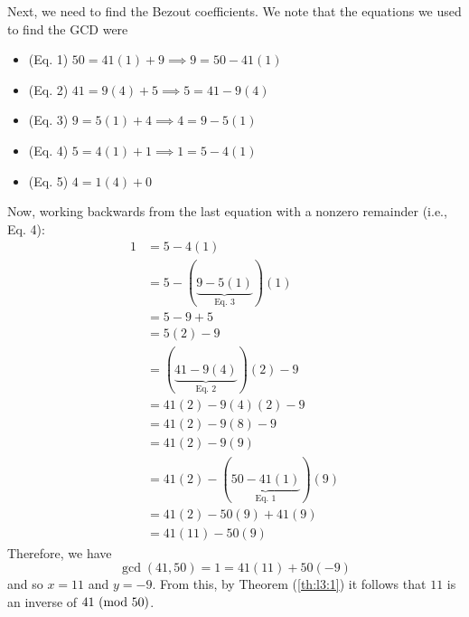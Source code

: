 \documentclass[letterpaper]{article}
\newcommand{\0}{\mathbf{0}}
\begin{document}
\begin{mdframed}
\begin{itemize}
\begin{mdframed}
            \bigskip 

            Next, we need to find the Bezout coefficients. We note that the equations we used to find the GCD were
            \begin{itemize}
                \item (Eq. 1) $50 = 41(1) + 9 \implies 9 = 50 - 41(1)$
                \item (Eq. 2) $41 = 9(4) + 5 \implies 5 = 41 - 9(4)$
                \item (Eq. 3) $9 = 5(1) + 4 \implies 4 = 9 - 5(1)$
                \item (Eq. 4) $5 = 4(1) + 1 \implies 1 = 5 - 4(1)$
                \item (Eq. 5) $4 = 1(4) + 0$
            \end{itemize}
            
            Now, working backwards from the last equation with a nonzero remainder (i.e., Eq. 4):
            \begin{equation*}
                \begin{aligned}
                    1 &= 5 - 4(1) \\ 
                        &= 5 - (\underbrace{9 - 5(1)}_{\text{Eq. 3}})(1) \\ 
                        &= 5 - 9 + 5 \\ 
                        &= 5(2) - 9 \\ 
                        &= (\underbrace{41 - 9(4)}_{\text{Eq. 2}})(2) - 9 \\ 
                        &= 41(2) - 9(4)(2) - 9 \\ 
                        &= 41(2) - 9(8) - 9 \\ 
                        &= 41(2) - 9(9) \\ 
                        &= 41(2) - (\underbrace{50 - 41(1)}_{\text{Eq. 1}})(9) \\ 
                        &= 41(2) - 50(9) + 41(9) \\ 
                        &= 41(11) - 50(9)
                \end{aligned}
            \end{equation*}
            Therefore, we have 
            \[\gcd(41, 50) = 1 = 41(11) + 50(-9)\]
            and so $x = 11$ and $y = -9$. From this, by Theorem (\ref{th:l3:1}) it follows that $\boxed{11}$ is an inverse of $41 \ (\mathrm{mod}\ 50)$. 
        \end{mdframed}
    \end{itemize}
\end{mdframed}
\end{document}
